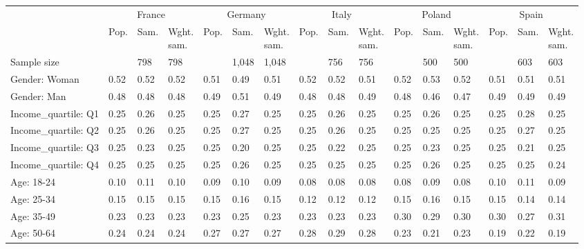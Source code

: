 
\begin{tabular}[t]{llllllllllllllll}
\toprule
\multicolumn{1}{c}{} & \multicolumn{3}{c}{France} & \multicolumn{3}{c}{Germany} & \multicolumn{3}{c}{Italy} & \multicolumn{3}{c}{Poland} & \multicolumn{3}{c}{Spain} \\
\cmidrule(l{3pt}r{3pt}){2-4} \cmidrule(l{3pt}r{3pt}){5-7} \cmidrule(l{3pt}r{3pt}){8-10} \cmidrule(l{3pt}r{3pt}){11-13} \cmidrule(l{3pt}r{3pt}){14-16}
  & Pop. & Sam. & \makecell{Wght.\\sam.} & Pop. & Sam. & \makecell{Wght.\\sam.} & Pop. & Sam. & \makecell{Wght.\\sam.} & Pop. & Sam. & \makecell{Wght.\\sam.} & Pop. & Sam. & \makecell{Wght.\\sam.}\\
\midrule
Sample size &  & 798 & 798 &  & 1,048 & 1,048 &  & 756 & 756 &  & 500 & 500 &  & 603 & 603\\
\addlinespace
Gender: Woman & 0.52 & 0.52 & 0.52 & 0.51 & 0.49 & 0.51 & 0.52 & 0.52 & 0.51 & 0.52 & 0.53 & 0.52 & 0.51 & 0.51 & 0.51\\
Gender: Man & 0.48 & 0.48 & 0.48 & 0.49 & 0.51 & 0.49 & 0.48 & 0.48 & 0.49 & 0.48 & 0.46 & 0.47 & 0.49 & 0.49 & 0.49\\
\addlinespace
Income\_quartile: Q1 & 0.25 & 0.26 & 0.25 & 0.25 & 0.27 & 0.25 & 0.25 & 0.26 & 0.25 & 0.25 & 0.26 & 0.25 & 0.25 & 0.28 & 0.25\\
Income\_quartile: Q2 & 0.25 & 0.26 & 0.25 & 0.25 & 0.27 & 0.25 & 0.25 & 0.26 & 0.25 & 0.25 & 0.25 & 0.25 & 0.25 & 0.27 & 0.25\\
Income\_quartile: Q3 & 0.25 & 0.23 & 0.25 & 0.25 & 0.20 & 0.25 & 0.25 & 0.22 & 0.25 & 0.25 & 0.23 & 0.25 & 0.25 & 0.21 & 0.25\\
Income\_quartile: Q4 & 0.25 & 0.25 & 0.25 & 0.25 & 0.26 & 0.25 & 0.25 & 0.25 & 0.25 & 0.25 & 0.26 & 0.25 & 0.25 & 0.25 & 0.24\\
\addlinespace
Age: 18-24 & 0.10 & 0.11 & 0.10 & 0.09 & 0.10 & 0.09 & 0.08 & 0.08 & 0.08 & 0.08 & 0.09 & 0.08 & 0.10 & 0.11 & 0.09\\
Age: 25-34 & 0.15 & 0.15 & 0.15 & 0.15 & 0.16 & 0.15 & 0.12 & 0.12 & 0.12 & 0.15 & 0.16 & 0.15 & 0.15 & 0.14 & 0.14\\
Age: 35-49 & 0.23 & 0.23 & 0.23 & 0.23 & 0.25 & 0.23 & 0.23 & 0.23 & 0.23 & 0.30 & 0.29 & 0.30 & 0.30 & 0.27 & 0.31\\
Age: 50-64 & 0.24 & 0.24 & 0.24 & 0.27 & 0.27 & 0.27 & 0.28 & 0.29 & 0.28 & 0.23 & 0.21 & 0.23 & 0.19 & 0.22 & 0.19\\

\end{tabular}

